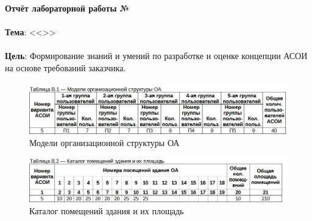 \documentclass[12pt, a4paper, simple]{eskdtext}
\def \gpiDocTopic {Отчёт лабораторной работы №\gpiDocNum}
\begin{document}
    
    \thispagestyle{plain}
    \pagestyle{plain}

    \begin{center}
        \textbf{\gpiDocTopic}
    \end{center}

    \paragraph{} \textbf{Тема}: <<\gpiTopicRep>>

    \paragraph{} \textbf{Цель}:
    Формирование знаний и умений по разработке и оценке концепции АСОИ на основе требований заказчика.



    \paragraph{} \hspace{0pt}

    \begin{figure}[h!]
        \centering
        \includegraphics[width=14cm]
            {_docs/ТаблицаВ1МоделиОрганизационнойСтруктурыОА.jpg}
        \caption{Модели организационной структуры ОА}
    \end{figure}

    \begin{figure}[h!]
        \centering
        \includegraphics[width=14cm]
            {_docs/ТаблицаВ2КаталогПомещенийЗданияИИхПлощадь.jpg}
        \caption{Каталог помещений здания и их площадь}
    \end{figure}
\end{document}
